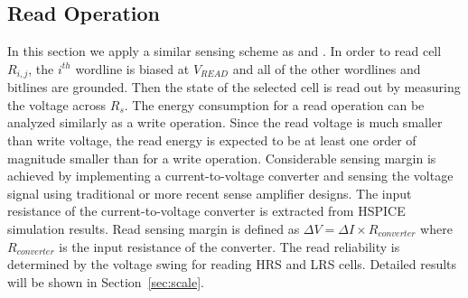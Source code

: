 \subsection{Read Operation}
In this section we apply a similar sensing scheme as
\cite{crossbar_NANO08_Flocke} and \cite{crossbar_TED_2010}. In order to
read cell $R_{i,j}$, the $i^{th}$ wordline is biased at $V_{READ}$ and all of the other wordlines and bitlines are grounded. Then the state of the
selected cell is read out by measuring the voltage across $R_s$. The
energy consumption for a read operation can be analyzed similarly as
a write operation. Since the read voltage is much smaller than
write voltage, the read energy is expected to be at least one order of magnitude smaller than for a write operation. Considerable sensing margin is achieved by implementing a current-to-voltage converter and sensing the voltage signal using traditional or more recent sense amplifier designs. The input resistance of the current-to-voltage converter is extracted from HSPICE simulation results. Read sensing margin is defined as $\Delta V = \Delta I \times R_{converter}$ where $R_{converter}$ is the input resistance of the converter.
The read reliability is determined by the voltage swing for reading HRS
and LRS cells.
Detailed results will be shown in Section~\ref{sec:scale}.



